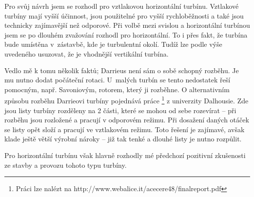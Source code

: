 		Pro svůj návrh jsem se rozhodl pro vztlakovou horizontální turbínu. Vztlakové turbíny mají vyšší účinnost, jsou použitelné pro vyšší rychloběžnosti a také jsou technicky zajímavější než odporové. Při volbě mezi svislou a horizontální turbínou jsem se po dlouhém zvažování rozhodl pro horizontální. To i přes fakt, že turbína bude umístěna v~zástavbě, kde je turbulentní okolí. Tudíž lze podle výše uvedeného usuzovat, že je vhodnější vertikální turbína.
		
		Vedlo mě k tomu několik faktů; Darrieus není sám o sobě schopný rozběhu. Je mu nutno dodat počáteční rotaci. U~malých turbín se tento nedostatek řeší pomocným, např. Savoniovým, rotorem, který ji rozběhne. O alternativním způsobu rozběhu Darrieovi turbíny pojednává práce \footnote{Práci lze nalézt na http://www.webalice.it/acecere48/finalreport.pdf} z univerzity Dalhousie. Zde jsou listy turbíny rozděleny na 2 části, které se mohou od sebe rozevírat – při rozběhu jsou rozložené a pracují v odporovém režimu. Při dosažení daných otáček se listy opět složí a pracují ve vztlakovém režimu. Toto řešení je zajímavé, avšak klade ještě větší výrobní nároky – již tak tenké a dlouhé listy je nutno rozpůlit.
		
		Pro horizontální turbínu však hlavně rozhodly mé předchozí pozitivní zkušenosti ze stavby a provozu tohoto typu turbíny.
		
